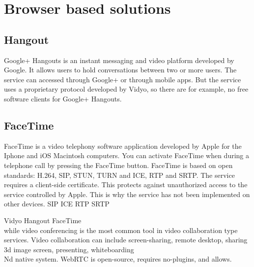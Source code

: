 \section{Browser based solutions}

\subsection{Hangout}
Google+ Hangouts is an instant messaging and video platform developed by Google. It allows users to hold conversations between two or more users. The service can accessed through Google+ or through mobile apps. But the service uses a proprietary protocol developed by Vidyo, so there are for example, no free software clients for Google+ Hangouts.

\subsection{FaceTime}
FaceTime is a video telephony software application developed by Apple for the Iphone and iOS Macintosh computers. You can activate FaceTime when during a telephone call by pressing the FaceTime button. FaceTime is based on open standards:
H.264, SIP, STUN, TURN and ICE, RTP and SRTP. The service requires a client-side certificate. This protects against unauthorized access to the service controlled by Apple. This is why the service has not been implemented on other devices.
SIP ICE RTP SRTP

Vidyo Hangout FaceTime
\\
while video conferencing is the most common tool in video collaboration type services. Video collaboration can include screen-sharing, remote desktop, sharing 3d image screen, presenting, whiteboarding
\\
Nd native system. WebRTC is open-source, requires no-plugins, and allows.
